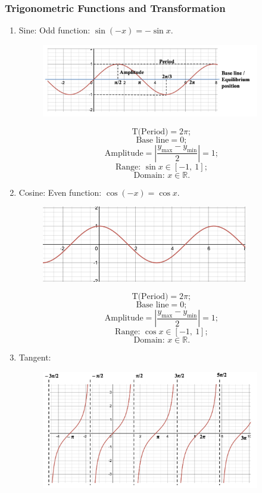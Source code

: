 \documentclass[12pt, a4paper]{article}
\def\R{{\mathbb{R}}}
\begin{document}
\subsubsection{Trigonometric Functions and Transformation}
\begin{enumerate}
  \item Sine: Odd function: $\sin{(-x)}=-\sin{x}$.
  \begin{figure}[H]
    \centering
    \includegraphics[width=0.9\textwidth]{Fig.3.25.jpg}
  \end{figure}
  $$\text{T(Period)}=2\pi;$$
  $$\text{Base line}=0;$$
  $$\text{Amplitude}=\left|\frac{y_{\text{max}}-y_{\text{min}}}{2}\right|=1;$$
  $$\text{Range: }\sin{x}\in\left[-1,\ 1\right];$$
  $$\text{Domain: }x\in\R.$$
  \item Cosine: Even function: $\cos{(-x)}=\cos{x}$.
  \begin{figure}[H]
    \centering
    \includegraphics[width=0.85\textwidth]{Fig.3.26.jpg}
  \end{figure}
  $$\text{T(Period)}=2\pi;$$
  $$\text{Base line}=0;$$
  $$\text{Amplitude}=\left|\frac{y_{\text{max}}-y_{\text{min}}}{2}\right|=1;$$
  $$\text{Range: }\cos{x}\in\left[-1,\ 1\right];$$
  $$\text{Domain: }x\in\R.$$
  \item Tangent: 
  \begin{figure}[H]
    \centering
    \includegraphics[width=0.9\textwidth]{Fig.3.27.jpg}

\end{figure}
\end{enumerate}
\end{document}
